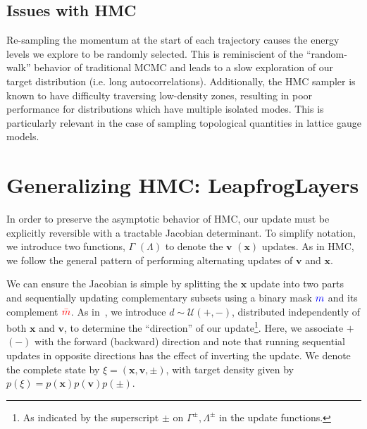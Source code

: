 \documentclass[a4paper,11pt]{article}
\newcommand{\x}{\mathbf{x}}
\newcommand{\p}{\mathbf{v}}
\newcommand{\mask}{\textcolor{blue}{{m}}}
\newcommand{\maskbar}{\textcolor{red}{\bar{m}}}
\begin{document}
\subsection{\label{subsec:hmc_issues}Issues with HMC}
%
Re-sampling the momentum at the start of each trajectory causes the energy
levels we explore to be randomly selected.
%
This is reminiscient of the ``random-walk'' behavior of traditional MCMC and
leads to a slow exploration of our target distribution (i.e. long
autocorrelations).
%
Additionally, the HMC sampler is known to have difficulty traversing
low-density zones, resulting in poor performance for distributions which have
multiple isolated modes.
%
This is particularly relevant in the case of sampling topological quantities in
lattice gauge models.
%
\section{\label{sec:l2hmc}Generalizing HMC: LeapfrogLayers}
%
In order to preserve the asymptotic behavior of HMC, our update must be
explicitly reversible with a tractable Jacobian determinant.
%
To simplify notation, we introduce two functions, \(\Gamma\) \((\Lambda)\) to
denote the \(\p\) \((\x)\) updates.
%
As in HMC, we follow the general pattern of performing alternating updates of
\(\p\) and \(\x\).
%

We can ensure
the Jacobian is simple
by splitting the \(\x\) update into two
parts and sequentially updating complementary subsets using a binary mask
\(\mask\) and its complement \(\maskbar\).
%
As in~\cite{2017arXiv171109268L}, we introduce \(d \sim \mathcal{U} (+, -)\),
distributed independently of both \(\x\) and \(\p\), to determine the
``direction'' of our update\footnote{%
  As indicated by the superscript \(\pm\) on \(\Gamma^{\pm}, \Lambda^{\pm}\) in
  the update functions.
}.
%
Here, we associate \(+\) \((-)\) with the forward (backward) direction and note
that running sequential updates in opposite directions has the effect of
inverting the update.
%
We denote the complete state by \(\xi = (\x, \p, \pm)\), with target density
given by \(p(\xi) = p(\x) p(\p) p(\pm)\).
%
\end{document}
